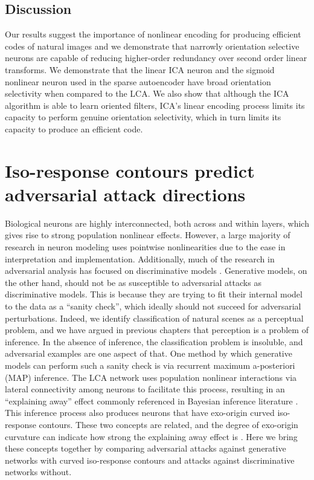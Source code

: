 \subsection{Discussion}
Our results suggest the importance of nonlinear encoding for producing efficient codes of natural images and we demonstrate that narrowly orientation selective neurons are capable of reducing higher-order redundancy over second order linear transforms.
We demonstrate that the linear ICA neuron and the sigmoid nonlinear neuron used in the sparse autoencoder have broad orientation selectivity when compared to the LCA.
We also show that although the ICA algorithm is able to learn oriented filters, ICA's linear encoding process limits its capacity to perform genuine orientation selectivity, which in turn limits its capacity to produce an efficient code.



\section{Iso-response contours predict adversarial attack directions}\label{sec:ch4_adv_defense}
Biological neurons are highly interconnected, both across and within layers, which gives rise to strong population nonlinear effects.
However, a large majority of research in neuron modeling uses pointwise nonlinearities due to the ease in interpretation and implementation.
Additionally, much of the research in adversarial analysis has focused on discriminative models \parencite{ng2002discriminative}.
Generative models, on the other hand, should not be as susceptible to adversarial attacks as discriminative models.
This is because they are trying to fit their internal model to the data as a ``sanity check'', which ideally should not succeed for adversarial perturbations.
Indeed, we identify classification of natural scenes as a perceptual problem, and we have argued in previous chapters that perception is a problem of inference.
In the absence of inference, the classification problem is insoluble, and adversarial examples are one aspect of that.
One method by which generative models can perform such a sanity check is via recurrent maximum a-posteriori (MAP) inference.
The LCA network uses population nonlinear interactions via lateral connectivity among neurons to facilitate this process, resulting in an ``explaining away'' effect commonly referenced in Bayesian inference literature \parencite{olshausen2013perception}.
This inference process also produces neurons that have exo-origin curved iso-response contours.
These two concepts are related, and the degree of exo-origin curvature can indicate how strong the explaining away effect is \parencite{vilankar2017selectivity}.
Here we bring these concepts together by comparing adversarial attacks against generative networks with curved iso-response contours and attacks against discriminative networks without.



